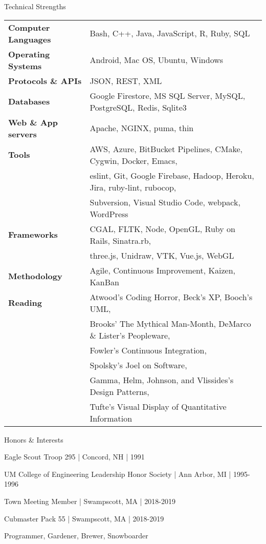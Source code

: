 \documentclass{resume}
\begin{document}
\begin{rSection}{Technical Strengths}
\begin{tabular}{ @{} >{\bfseries}l @{\hspace{6ex}} l }
Computer Languages & Bash, C++, Java, JavaScript, R, Ruby, SQL \\
Operating Systems & Android, Mac OS, Ubuntu, Windows \\
Protocols \& APIs & JSON, REST, XML \\
Databases & Google Firestore, MS SQL Server, MySQL, PostgreSQL, Redis, Sqlite3 \\
Web \& App servers & Apache, NGINX, puma, thin \\
Tools & AWS, Azure, BitBucket Pipelines, CMake, Cygwin, Docker, Emacs, \\
 & eslint, Git, Google Firebase, Hadoop, Heroku, Jira, ruby-lint, rubocop, \\
 & Subversion, Visual Studio Code, webpack, WordPress \\
Frameworks & CGAL, FLTK, Node, OpenGL, Ruby on Rails, Sinatra.rb, \\
 & three.js, Unidraw, VTK, Vue.js, WebGL \\
Methodology & Agile, Continuous Improvement, Kaizen, KanBan \\
Reading & Atwood's Coding Horror, Beck's XP, Booch's UML, \\
 & Brooks' The Mythical Man-Month, DeMarco \& Lister's Peopleware, \\
 & Fowler's Continuous Integration, \\
 & Spolsky's Joel on Software, \\
 & Gamma, Helm, Johnson, and Vlissides's Design Patterns, \\
 & Tufte's Visual Display of Quantitative Information
\end{tabular}
\end{rSection}

\begin{rSection}{Honors \& Interests}
\item Eagle Scout Troop 295 | Concord, NH | 1991
\item UM College of Engineering Leadership Honor Society | Ann Arbor, MI | 1995-1996
\item Town Meeting Member | Swampscott, MA | 2018-2019 
\item Cubmaster Pack 55 | Swampscott, MA | 2018-2019 
\item Programmer, Gardener, Brewer, Snowboarder
\end{rSection}
\end{document}
